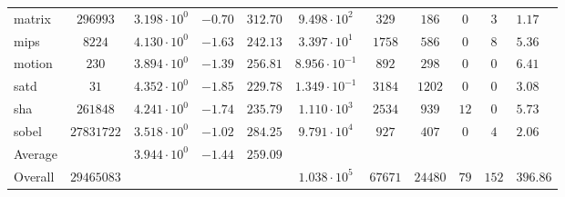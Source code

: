 \begin{tabular}{|l|c|HHc|c|c|c|c|cH|}
matrix        & $ 296993   $ & $ 3.198 \cdot 10^{0} $ & $ -0.70 $ & $ 312.70 $ & $ 9.498 \cdot 10^{2}  $ & $ 329   $ & $ 186   $ & $ 0   $ & $ 3   $ & $ 1.17    $ \\
mips          & $ 8224     $ & $ 4.130 \cdot 10^{0} $ & $ -1.63 $ & $ 242.13 $ & $ 3.397 \cdot 10^{1}  $ & $ 1758  $ & $ 586   $ & $ 0   $ & $ 8   $ & $ 5.36    $ \\
motion        & $ 230      $ & $ 3.894 \cdot 10^{0} $ & $ -1.39 $ & $ 256.81 $ & $ 8.956 \cdot 10^{-1} $ & $ 892   $ & $ 298   $ & $ 0   $ & $ 0   $ & $ 6.41    $ \\
satd          & $ 31       $ & $ 4.352 \cdot 10^{0} $ & $ -1.85 $ & $ 229.78 $ & $ 1.349 \cdot 10^{-1} $ & $ 3184  $ & $ 1202  $ & $ 0   $ & $ 0   $ & $ 3.08    $ \\
sha           & $ 261848   $ & $ 4.241 \cdot 10^{0} $ & $ -1.74 $ & $ 235.79 $ & $ 1.110 \cdot 10^{3}  $ & $ 2534  $ & $ 939   $ & $ 12  $ & $ 0   $ & $ 5.73    $ \\
sobel         & $ 27831722 $ & $ 3.518 \cdot 10^{0} $ & $ -1.02 $ & $ 284.25 $ & $ 9.791 \cdot 10^{4}  $ & $ 927   $ & $ 407   $ & $ 0   $ & $ 4   $ & $ 2.06    $ \\
\hline
Average       & $          $ & $ 3.944 \cdot 10^{0} $ & $ -1.44 $ & $ 259.09 $ & $                     $ & $       $ & $       $ & $     $ & $     $ & $         $ \\
\hline
Overall       & $ 29465083 $ & $                    $ & $       $ & $        $ & $ 1.038 \cdot 10^{5}  $ & $ 67671 $ & $ 24480 $ & $ 79  $ & $ 152 $ & $ 396.86  $ \\
\hline
\end{tabular}
